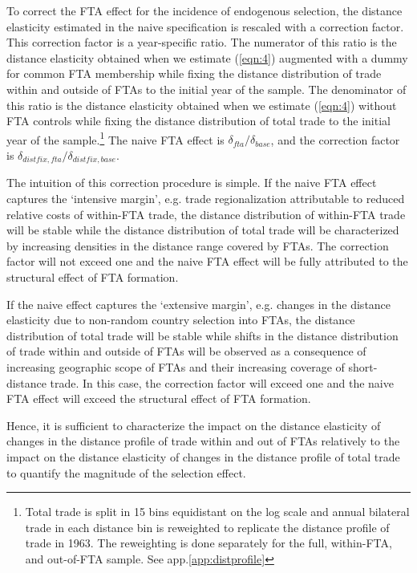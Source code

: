 \documentclass[12pt,twoside,a4paper,notitlepage]{article}
\begin{document}
To correct the FTA effect for the incidence of endogenous selection, the distance elasticity estimated in the naive  specification is rescaled with a correction factor.
This correction factor is a year-specific ratio.
The numerator of this ratio is the distance elasticity obtained when we estimate (\ref{eqn:4}) augmented with a dummy for common FTA membership while fixing the distance distribution of trade within and outside of FTAs to the initial year of the sample.
The denominator of this ratio is the distance elasticity obtained when we estimate (\ref{eqn:4}) without FTA controls while fixing the distance distribution of total trade to the initial year of the sample.\footnote{Total trade is split in 15 bins equidistant on the log scale and annual bilateral trade in each distance bin is reweighted to replicate the distance profile of trade in 1963.
The reweighting is done separately for the full, within-FTA, and out-of-FTA sample.
See app.\ref{app:distprofile}}
The naive FTA effect is $\delta_{fta}/\delta_{base}$, and the correction factor is $\delta_{distfix,fta}/\delta_{distfix,base}$.


The intuition of this correction procedure is simple.
If the naive FTA effect captures the `intensive margin', e.g.
trade regionalization attributable to reduced relative costs of within-FTA trade, the distance distribution of within-FTA trade will be stable while the distance distribution of total trade will be characterized by increasing densities in the distance range covered by FTAs.
The correction factor will not exceed one and the naive FTA effect will be fully attributed to the structural effect of FTA formation.

If the naive effect captures the `extensive margin', e.g.
changes in the distance elasticity due to non-random country selection into FTAs, the distance distribution of total trade will be stable while shifts in the distance distribution of trade within and outside of FTAs will be observed as a consequence of increasing geographic scope of FTAs and their increasing coverage of short-distance trade.
In this case, the correction factor will exceed one and the naive FTA effect will exceed the structural effect of FTA formation.


Hence, it is sufficient to characterize the impact on the distance elasticity of changes in the distance profile of trade within and out of FTAs relatively to the impact on the distance elasticity of changes in the distance profile of total trade to quantify the magnitude of the selection effect.
\end{document}
